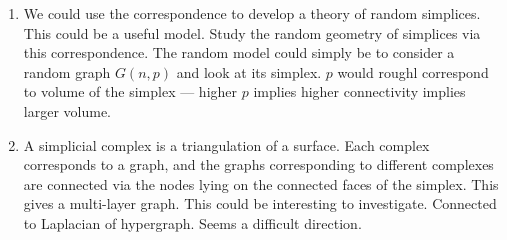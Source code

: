 \begin{enumerate}
     
    \item We could use the correspondence to develop a theory of random simplices. This could be a useful model. Study the random geometry of simplices via this correspondence. The random model could simply be to consider a random graph $G(n,p)$ and look at its simplex. $p$ would roughl correspond to volume of the simplex --- higher $p$ implies higher connectivity implies larger volume. 
    \item A simplicial complex is a triangulation of a surface. Each complex corresponds to a graph, and the graphs corresponding to different complexes are connected via the nodes lying on the connected faces of the simplex. This gives a multi-layer graph. This could be interesting to investigate.  Connected to Laplacian of hypergraph. Seems a difficult direction.  
    
    
\end{enumerate}
